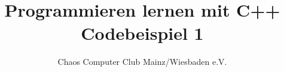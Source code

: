 


	\title{Programmieren lernen mit C++\\Codebeispiel 1}
	\author{Chaos Computer Club Mainz/Wiesbaden e.V.}
	\maketitle
	
	\section*{}
	
	\lstset{numbers=left}
	
	
